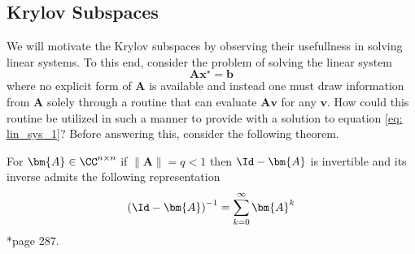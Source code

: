 
\subsection{Krylov Subspaces}\label{Section4.1}

We will motivate the Krylov subspaces by observing their usefullness in solving linear systems. To this end, consider the problem of solving the linear system
\begin{equation}\label{eq: lin_sys_1}
    \bm{A} \bm{x^{\star}} = \bm{b}
\end{equation}
where no explicit form of $\bm{A}$ is available and instead one must draw information from $\bm{A}$ solely through a routine that can evaluate $\bm{A} \bm{v}$ for any $\bm{v}$. How could this routine be utilized in such a manner to provide with a solution to equation \ref{eq: lin_sys_1}? Before answering this, consider the following theorem.

\begin{thm} \label{theorem: invert_mat_norm}
    For $\bm{A} \in \CC^{n \times n}$ if $\| \bm{A} \| = q < 1$ then $\Id - \bm{A}$ is invertible and its inverse admits the following representation
    \begin{equation*} \label{eq: convg-of-part}
        \left( \Id - \bm{A} \right)^{-1} = \sum_{k=0}^{\infty} \bm{A}^k
    \end{equation*}
    \cite{BerezanskyMakarovich1996FaV1}*{page 287}.
\end{thm}

